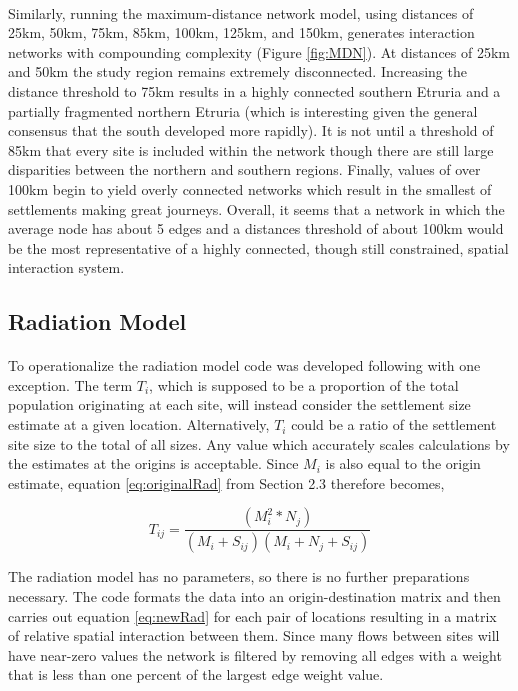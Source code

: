 \documentclass[12pt,a4paper]{thesis}
\begin{document}
\paragraph{}
Similarly, running the maximum-distance network model, using distances of 25km, 50km, 75km, 85km, 100km, 125km, and 150km, generates interaction networks with compounding complexity (Figure \ref{fig:MDN}). At distances of 25km and 50km the study region remains extremely disconnected. Increasing the distance threshold to 75km results in a highly connected southern Etruria and a partially fragmented northern Etruria (which is interesting given the general consensus that the south developed more rapidly). It is not until a threshold of 85km that every site is included within the network though there are still large disparities between the northern and southern regions. Finally, values of over 100km begin to yield overly connected networks which result in the smallest of settlements making great journeys. Overall, it seems that a network in which the average node has about 5 edges and a distances threshold of about 100km would be the most representative of a highly connected, though still constrained, spatial interaction system.  


 

\subsection{Radiation Model}
\paragraph{}
To operationalize the radiation model code was developed following \cite{Bar12} with one exception. The term  $T_{i}$, which is supposed to be a proportion of the total population originating at each site, will instead consider the settlement size estimate at a given location. Alternatively, $T_{i}$ could be a ratio of the settlement site size to the total of all sizes. Any value which accurately scales calculations by the estimates at the origins is acceptable. Since $M_{i}$ is also equal to the origin estimate, equation \ref{eq:originalRad} from Section 2.3 therefore becomes,
						
				
				\begin{equation}						
				T_{ij} = \frac{(M_{i}^2*N_{j})}{(M_{i}+S_{ij})(M_{i}+N_{j}+S_{ij})}
				\label{eq:newRad}	
				\end{equation}
						
The radiation model has no parameters, so there is no further preparations necessary. The code formats the data into an origin-destination matrix and then  carries out equation \ref{eq:newRad} for each pair of locations resulting in a matrix of relative spatial interaction between them. Since many flows between sites will have near-zero values the network is filtered by removing all edges with a weight that is less than one percent of the largest edge weight value. 
\end{document}
